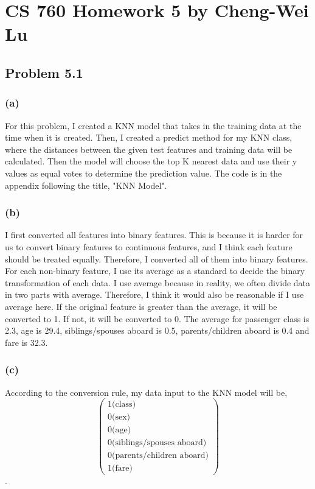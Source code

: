 \documentclass{article}
\begin{document}
\section*{CS 760 Homework 5 by Cheng-Wei Lu}

\subsection*{Problem 5.1}
\subsubsection*{(a)}
	For this problem, I created a KNN model that takes in the training data at the time when it is created. Then, I created  a predict method for my KNN class, where the distances between the given test features and training data will be calculated. Then the model will choose the top K nearest data and use their y values as equal votes to determine the prediction value. The code is in the appendix following the title, "KNN Model".
\subsubsection*{(b)}
	I first converted all features into binary features. This is because it is harder for us to convert binary features to continuous features, and I think each feature should be treated equally. Therefore, I converted all of them into binary features. For each non-binary feature, I use its average as a standard to decide the binary transformation of each data. I use average because in reality, we often divide data in two parts with average. Therefore, I think it would also be reasonable if I use average here. If the original feature is greater than the average, it will be converted to 1. If not, it will be converted to 0. The average for passenger class is 2.3, age is 29.4, siblings/spouses aboard is 0.5, parents/children aboard is 0.4 and fare is 32.3. 
\subsubsection*{(c)}
	According to the conversion rule, my data input to the KNN model will be,
	\begin{equation*}	
	\begin{pmatrix} 1 \text{(class)}\\ 0 \text{(sex)}\\ 0\text{(age)}\\ 0\text{(siblings/spouses aboard)}\\0\text{(parents/children aboard)}\\ 1\text{(fare)}\end{pmatrix} 
	\end{equation*}.
	
\end{document}
